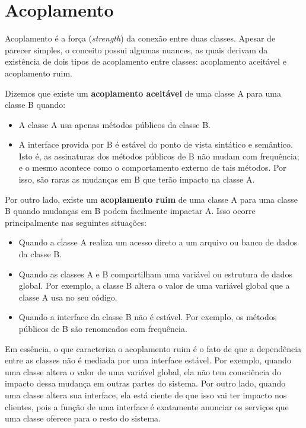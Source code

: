 \documentclass[
  11pt,
  twoside]{book}
\begin{document}
\hypertarget{acoplamento}{%
\section{Acoplamento}\label{acoplamento}}


Acoplamento é a força (\emph{strength}) da conexão entre duas classes.
Apesar de parecer simples, o conceito possui algumas nuances, as quais
derivam da existência de dois tipos de acoplamento entre classes:
acoplamento aceitável e acoplamento ruim.

Dizemos que existe um \textbf{acoplamento aceitável} de uma classe A
para uma classe B quando:

\begin{itemize}
\item
  A classe A usa apenas métodos públicos da classe B.
\item
  A interface provida por B é estável do ponto de vista sintático e
  semântico. Isto é, as assinaturas dos métodos públicos de B não mudam
  com frequência; e o mesmo acontece como o comportamento externo de
  tais métodos. Por isso, são raras as mudanças em B que terão impacto
  na classe A.
\end{itemize}

 Por outro lado, existe um \textbf{acoplamento
ruim} de uma classe A para uma classe B quando mudanças em B podem
facilmente impactar A. Isso ocorre principalmente nas seguintes
situações:

\begin{itemize}
\item
  Quando a classe A realiza um acesso direto a um arquivo ou banco de
  dados da classe B.
\item
  Quando as classes A e B compartilham uma variável ou estrutura de
  dados global. Por exemplo, a classe B altera o valor de uma variável
  global que a classe A usa no seu código.
\item
  Quando a interface da classe B não é estável. Por exemplo, os métodos
  públicos de B são renomeados com frequência.
\end{itemize}

Em essência, o que caracteriza o acoplamento ruim é o fato de que a
dependência entre as classes não é mediada por uma interface estável.
Por exemplo, quando uma classe altera o valor de uma variável global,
ela não tem consciência do impacto dessa mudança em outras partes do
sistema. Por outro lado, quando uma classe altera sua interface, ela
está ciente de que isso vai ter impacto nos clientes, pois a função de
uma interface é exatamente anunciar os serviços que uma classe oferece
para o resto do sistema.
\end{document}
